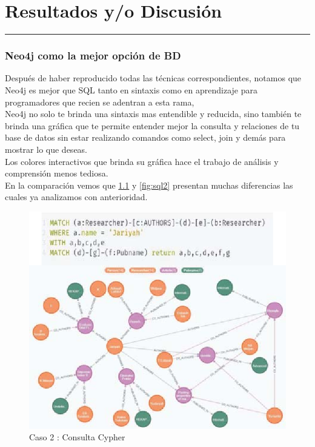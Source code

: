 \chapter{Resultados y/o Discusión}
\hrule \bigskip \vspace*{1cm}
\subsection{Neo4j como la mejor opción de BD}
Después de haber reproducido todas las técnicas correspondientes, notamos que Neo4j es mejor que SQL tanto en sintaxis como en aprendizaje para programadores que recien se adentran a esta rama,\\
Neo4j no solo te brinda una sintaxis mas entendible y reducida, sino también te brinda una gráfica que te permite entender mejor la consulta y relaciones de tu base de datos sin estar realizando comandos como select, join y demás para mostrar lo que deseas.\\
Los colores interactivos que brinda su gráfica hace el trabajo de análisis y comprensión menos tediosa.\\
En la comparación vemos que \ref{fig:neo2} y \ref{fig:sql2} presentan muchas diferencias las cuales ya analizamos con anterioridad.
\begin{figure}[H]
    \centering
    \includegraphics[scale=0.7]{Graficos/neo2.png}
    \caption{Caso 2 : Consulta Cypher}
    \label{fig:neo2}
    \end{figure}
